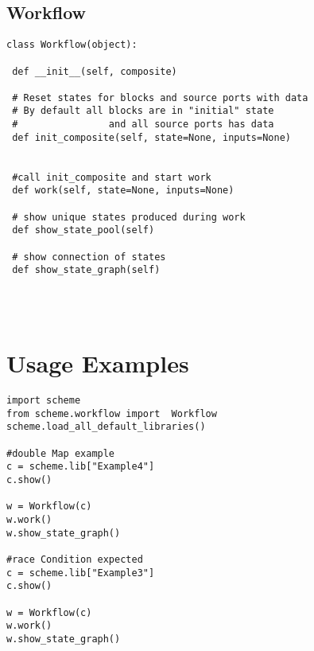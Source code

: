 \documentclass[a4paper,16pt]{article}
\begin{document}
\subsection*{Workflow}
\begin{lstlisting}
class Workflow(object):

 def __init__(self, composite)

 # Reset states for blocks and source ports with data
 # By default all blocks are in "initial" state 
 #                and all source ports has data
 def init_composite(self, state=None, inputs=None)


 #call init_composite and start work
 def work(self, state=None, inputs=None)
 
 # show unique states produced during work
 def show_state_pool(self)

 # show connection of states
 def show_state_graph(self)




\end{lstlisting}


\section{Usage Examples}
\begin{lstlisting}
import scheme
from scheme.workflow import  Workflow
scheme.load_all_default_libraries()

#double Map example
c = scheme.lib["Example4"]
c.show()

w = Workflow(c)
w.work()
w.show_state_graph()

#race Condition expected
c = scheme.lib["Example3"]
c.show()

w = Workflow(c)
w.work()
w.show_state_graph()

\end{lstlisting}
\end{document}
